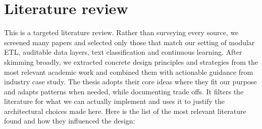 \chapter{Literature review}
\label{ch:chapter03}
This is a targeted literature review. Rather than surveying every source, we screened many papers and selected only those that match our setting of modular ETL, auditable data layers, text classification and continuous learning. After skimming broadly, we extracted concrete design principles and strategies from the most relevant academic work and combined them with actionable guidance from industry case study. The thesis adopts their core ideas where they fit our purpose and adapts patterns when needed, while documenting trade offs. It filters the literature for what we can actually implement and uses it to justify the architectural choices made here. Here is the list of the most relevant literature found and how they influenced the design:

